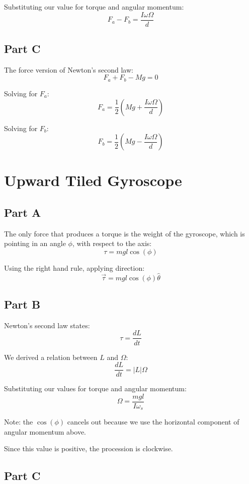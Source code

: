 \documentclass{article}
\begin{document}
Substituting our value for torque and angular momentum:
$$ F_{a} - F_{b} = \frac{ I \omega \Omega }{ d } $$

\subsection*{ Part C }

The force version of Newton's second law:
$$ F_{a} + F_{b} - Mg = 0 $$

Solving for $F_{a}$:
$$ F_{a} = \frac{ 1 }{ 2 } \left( Mg + \frac{ I \omega \Omega }{ d } \right) $$

Solving for $F_{b}$:
$$ F_{b} = \frac{ 1 }{ 2 } \left( Mg - \frac{ I \omega \Omega }{ d } \right) $$

\section{ Upward Tiled Gyroscope }

\subsection*{ Part A }

The only force that produces a torque is the weight of the gyroscope, which is
pointing in an angle $\phi$, with respect to the axis:
$$ \tau = mgl \cos( \phi ) $$

Using the right hand rule, applying direction:
$$ \vec{ \tau } = mgl \cos( \phi ) \hat{ \theta } $$

\subsection*{ Part B }

Newton's second law states:
$$ \tau = \frac{ dL }{ dt } $$

We derived a relation between $L$ and $\Omega$:
$$ \frac{ dL }{ dt } = \vert L \vert \Omega $$

Substituting our values for torque and angular momentum:
$$ \Omega = \frac{ mgl }{ I \omega_{s} } $$

Note: the $\cos( \phi )$ cancels out because we use the horizontal component of
angular momentum above.

Since this value is positive, the procession is clockwise.

\subsection*{ Part C }
\end{document}
